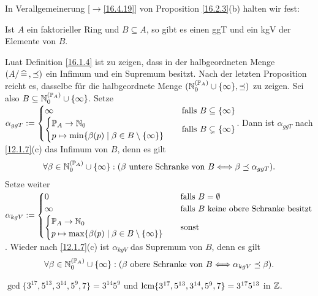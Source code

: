 \documentclass[../../main.tex]{subfiles}
\begin{document}
In Verallgemeinerung [$\to$\ref{16.4.19}] von Proposition \ref{16.2.3}(b) halten wir fest:

\begin{kor}\label{16.4.23}
Ist $A$ ein faktorieller Ring und $B\subseteq A$, so gibt es einen ggT und ein kgV der Elemente von $B$.
\end{kor}
\begin{cproof}
Luat Definition \ref{16.1.4} ist zu zeigen, dass in der halbgeordneten Menge $(A/\,\widehat{=}\,, \preceq)$ ein Infimum und ein Supremum besitzt. Nach der letzten Proposition reicht es, dasselbe für die halbgeordnete Menge $(\mathbb N_0^{(\mathbb P_A)}\cup\{\infty\},\preceq)$ zu zeigen. Sei also $B\subseteq \mathbb N_0^{(\mathbb P_A)}\cup\{\infty\}$. Setze\\ $\alpha_{ggT}:=\begin{cases}\infty & \text{falls }B\subseteq\{\infty\}\\\begin{cases}\mathbb P_A\to \mathbb N_0\\ p\mapsto \min\{\beta(p)\mid \beta\in B\setminus\{\infty\}\}\end{cases} & \text{falls }B\subsetneq\{\infty\}\end{cases}$. Dann ist $\alpha_{ggT}$ nach \ref{12.1.7}(c) das Infimum von $B$, denn es gilt
\begin{align*}
\forall \beta\in \mathbb N_0^{(\mathbb P_A)}\cup\{\infty\}: (\beta\text { untere Schranke von }B\Longleftrightarrow \beta\preceq \alpha_{ggT}).
\end{align*}
Setze weiter\\ $\alpha_{kgV}:=\begin{cases}0&\text{falls }B=\emptyset\\ \infty & \text{falls }B\text{ keine obere Schranke besitzt}\\
\begin{cases}\mathbb P_A\to \mathbb N_0\\ p\mapsto \max\{\beta(p)\mid \beta\in B\setminus\{\infty\}\}\end{cases} & \text{sonst}\end{cases}$.  Wieder nach \ref{12.1.7}(c) ist $\alpha_{kgV}$ das Supremum von $B$, denn es gilt
\begin{align*}
\forall \beta\in \mathbb N_0^{(\mathbb P_A)}\cup\{\infty\}: (\beta\text { obere Schranke von }B\Longleftrightarrow \alpha_{kgV}\preceq \beta).
\end{align*} 
\end{cproof}

\begin{bsp}\label{16.4.23}
$\gcd\{3^{17},5^{13},3^{14},5^9,7\}=3^{14}5^9$ und $\operatorname{lcm}\{3^{17},5^{13},3^{14},5^9,7\}=3^{17}5^{13}$ in $\mathbb Z$.
\end{bsp}
\end{document}
